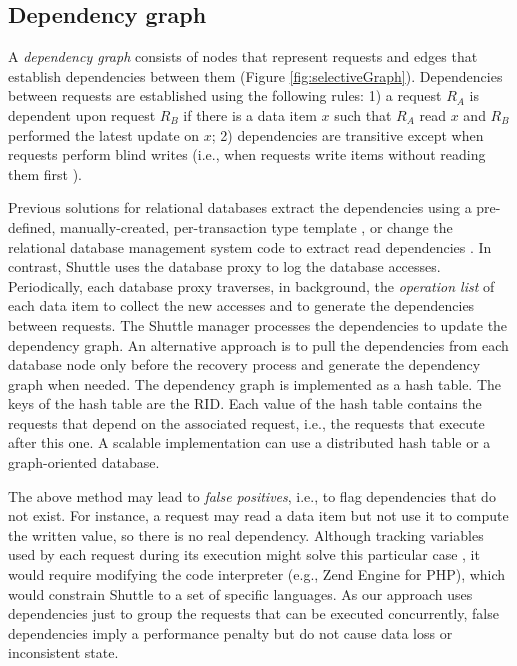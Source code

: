 \subsection{Dependency graph}
\label{sec:recovery:dependencies}

A \emph{dependency graph} consists of nodes that represent requests and edges that establish dependencies between them (Figure \ref{fig:selectiveGraph}). Dependencies between requests are established using the following rules: 1) a request $R_A$ is dependent upon request $R_B$ if there is a data item $x$ such that $R_A$ read $x$ and $R_B$ performed the latest update on $x$; 2) dependencies are transitive except when requests perform blind writes (i.e., when requests write items without reading them first \cite{itdb}). 

Previous solutions for relational databases extract the dependencies using a pre-defined, manually-created, per-transaction type template \cite{itdb}, or change the relational database management system code to extract read dependencies \cite{phoenix}. In contrast, Shuttle uses the database proxy to log the database accesses. Periodically, each database proxy traverses, in background, the \emph{operation list} of each data item to collect the new accesses and to generate the dependencies between requests. The Shuttle manager processes the dependencies to update the dependency graph. An alternative approach is to pull the dependencies from each database node only before the recovery process and generate the dependency graph when needed. The dependency graph is implemented as a hash table. The keys of the hash table are the \ac{RID}. Each value of the hash table contains the requests that depend on the associated request, i.e., the requests that execute after this one. A scalable implementation can use a distributed hash table or a graph-oriented database.

The above method may lead to \emph{false positives}, i.e., to flag dependencies that do not exist. For instance, a request may read a data item but not use it to compute the written value, so there is no real dependency. Although tracking variables used by each request during its execution might solve this particular case \cite{Akkus2010}, it would require modifying the code interpreter (e.g., Zend Engine for PHP), which would constrain Shuttle to a set of specific languages. As our approach uses dependencies just to group the requests that can be executed concurrently, false dependencies imply a performance penalty but do not cause data loss or inconsistent state.

